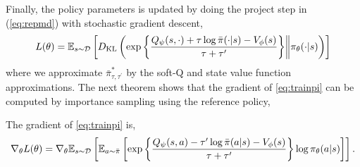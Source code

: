 Finally, the policy parameters is updated by doing the project step in (\ref{eq:repmd}) with stochastic gradient descent,
\begin{equation}
\label{eq:trainpi}
L(\theta) = \mathbb{E}_{s \sim {\mathcal{D}}} \left[ D_{\mathrm{KL}} \left( \exp\left\{ \frac{Q_{\psi}(s,\cdot) + \tau \log \bar{\pi}(\cdot|s) - V_{\phi}(s)}{\tau+\tau'} \right\} \middle\Vert \pi_{\theta}(\cdot |s) \right) \right]
\end{equation}
where we approximate $\bar{\pi}_{\tau,\tau^{\prime}}^*$ by the soft-Q and state value function approximations. The next theorem shows that the gradient of \cref{eq:trainpi} can be computed by importance sampling using the reference policy, 
\begin{thm}
\label{thm:rmacgradientestimate}
The gradient of \cref{eq:trainpi} is,
\begin{equation}
\label{eq:mac_gradient_estimator}
	\nabla_\theta L(\theta) = \nabla_\theta \mathbb{E}_{s \sim {\mathcal{D}}} \left[ \mathbb{E}_{a\sim \bar{\pi}}\left[  \exp\left\{ \frac{Q_{\psi}(s,a) - \tau' \log \bar{\pi}(a|s) - V_{\phi}(s)}{\tau+\tau'} \right\} \log \pi_{\theta}(a |s) \right]   \right].
\end{equation}
\end{thm}

